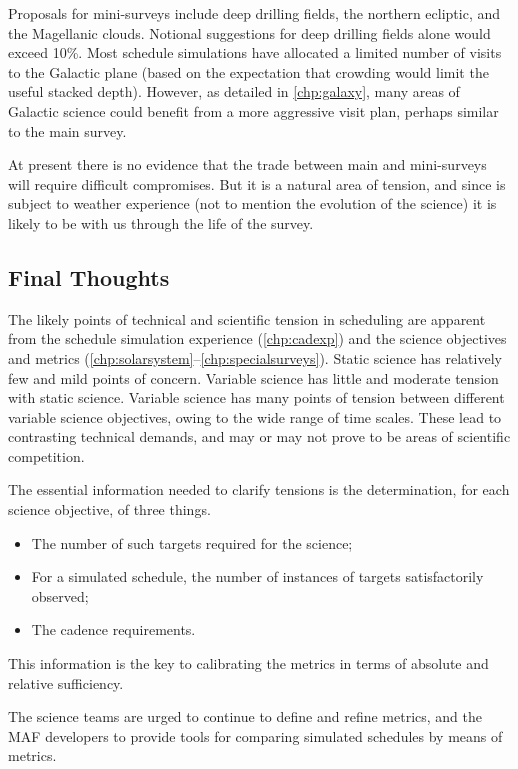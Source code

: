 Proposals for mini-surveys include deep drilling fields, the northern
ecliptic, and the Magellanic clouds. Notional suggestions for deep
drilling fields alone would exceed 10\%.   Most schedule simulations
have allocated a limited number of visits to the Galactic plane (based
on the expectation that crowding would limit the useful stacked depth).
However, as detailed in \autoref{chp:galaxy}, many areas of Galactic
science could benefit from a more aggressive visit plan, perhaps similar
to the main survey.

At present there is no evidence that the trade between main and
mini-surveys will require difficult compromises.  But it is a natural
area of tension, and since is subject to weather experience (not to
mention the evolution of the science) it is likely to be with us through
the life of the survey.


\subsection{Final Thoughts}

The likely points of technical and scientific tension in scheduling are
apparent from the schedule simulation experience (\autoref{chp:cadexp})
and the science objectives and metrics
(\autoref{chp:solarsystem}--\autoref{chp:specialsurveys}).  Static
science has relatively few and mild points of concern.  Variable science
has little and moderate tension with static science.  Variable science
has many points of tension between different variable science
objectives, owing to the wide range of time scales. These lead to
contrasting technical demands, and may or may not prove to be areas of
scientific competition.

The essential information needed to clarify tensions is the
determination, for each science objective, of three things.
\begin{itemize}
	\item The number of such targets required for the science;
	\item For a simulated schedule, the number of instances of targets satisfactorily observed;
	\item The cadence requirements.
\end{itemize}
This information is the key to calibrating the metrics in terms of
absolute and relative  sufficiency.

The science teams are urged to continue to define and refine metrics, and the MAF developers to provide
tools for comparing simulated schedules by means of metrics.

